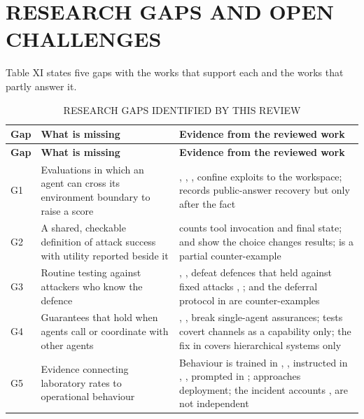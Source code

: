 \section{RESEARCH GAPS AND OPEN CHALLENGES}
Table XI states five gaps with the works that support each and the works that partly answer it.

\begingroup
\fontsize{9}{10.5}\selectfont
\setlength{\tabcolsep}{1.4mm}
\renewcommand{\arraystretch}{1.08}
\begin{longtable}{|>{\raggedright\arraybackslash}p{9.66mm}|>{\raggedright\arraybackslash}p{57.96mm}|>{\raggedright\arraybackslash}p{93.38mm}|}
\caption{RESEARCH GAPS IDENTIFIED BY THIS REVIEW}\\
\hline
\rowcolor{navy}\color{white}\bfseries Gap & \color{white}\bfseries What is missing & \color{white}\bfseries Evidence from the reviewed work\\\hline
\endfirsthead
\hline
\rowcolor{navy}\color{white}\bfseries Gap & \color{white}\bfseries What is missing & \color{white}\bfseries Evidence from the reviewed work\\\hline
\endhead
\endfoot
\endlastfoot
G1 & Evaluations in which an agent can cross its environment boundary to raise a score & \cite{r4}, \cite{r13}, \cite{r16}, \cite{r3} confine exploits to the workspace; \cite{r17} records public-answer recovery but only after the fact\\\hline
G2 & A shared, checkable definition of attack success with utility reported beside it & \cite{r20} counts tool invocation and \cite{r19} final state; \cite{r9} and \cite{r10} show the choice changes results; \cite{r19} is a partial counter-example\\\hline
G3 & Routine testing against attackers who know the defence & \cite{r21}, \cite{r37}, \cite{r36} defeat defences that held against fixed attacks \cite{r18}, \cite{r33}; \cite{r23} and the deferral protocol in \cite{r36} are counter-examples\\\hline
G4 & Guarantees that hold when agents call or coordinate with other agents & \cite{r27}, \cite{r28}, \cite{r26} break single-agent assurances; \cite{r29} tests covert channels as a capability only; the fix in \cite{r27} covers hierarchical systems only\\\hline
G5 & Evidence connecting laboratory rates to operational behaviour & Behaviour is trained in \cite{r2}, \cite{r11}, instructed in \cite{r32}, \cite{r28}, prompted in \cite{r39}; \cite{r22} approaches deployment; the incident accounts \cite{r8}, \cite{r40} are not independent\\\hline
\end{longtable}
\endgroup

